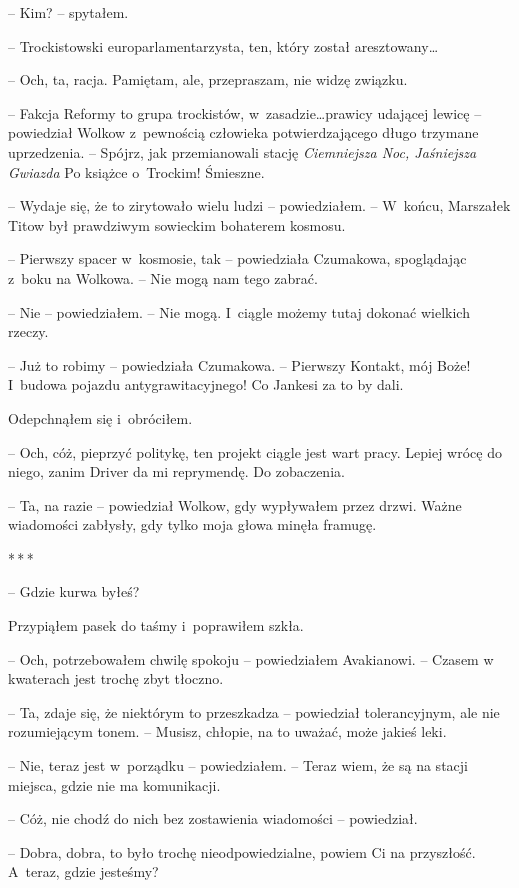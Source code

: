 \documentclass[oneside,polish,12pt,sfheadings]{mwbk}
\newcommand{\threeast}{\bigskip\par\centerline{*\,*\,*}\medskip\par}%
\begin{document}
-- Kim? -- spytałem.

-- Trockistowski europarlamentarzysta, ten, który został aresztowany\ldots

-- Och, ta, racja. Pamiętam, ale, przepraszam, nie widzę związku.

-- Fakcja Reformy to grupa trockistów, w~zasadzie\ldots prawicy udającej
lewicę -- powiedział Wolkow z~pewnością człowieka potwierdzającego długo
trzymane uprzedzenia. -- Spójrz, jak przemianowali stację
\emph{Ciemniejsza Noc, Jaśniejsza Gwiazda } Po książce o~Trockim!
Śmieszne.

-- Wydaje się, że to zirytowało wielu ludzi -- powiedziałem. -- W~końcu,
Marszałek Titow był prawdziwym sowieckim bohaterem kosmosu.

-- Pierwszy spacer w~kosmosie, tak -- powiedziała Czumakowa, spoglądając z~boku na Wolkowa. -- Nie mogą nam tego zabrać.

-- Nie -- powiedziałem. -- Nie mogą. I~ciągle możemy tutaj dokonać wielkich
rzeczy.

-- Już to robimy -- powiedziała Czumakowa. -- Pierwszy Kontakt, mój Boże! I~budowa pojazdu antygrawitacyjnego! Co Jankesi za to by dali.

Odepchnąłem się i~obróciłem.

-- Och, cóż, pieprzyć politykę, ten projekt ciągle jest wart pracy.
Lepiej wrócę do niego, zanim Driver da mi reprymendę. Do zobaczenia.

-- Ta, na razie -- powiedział Wolkow, gdy wypływałem przez drzwi. Ważne
wiadomości zabłysły, gdy tylko moja głowa minęła framugę.

\threeast

-- Gdzie kurwa byłeś?

Przypiąłem pasek do taśmy i~poprawiłem szkła.

-- Och, potrzebowałem chwilę spokoju -- powiedziałem Avakianowi. -- Czasem
w kwaterach jest trochę zbyt tłoczno.

-- Ta, zdaje się, że niektórym to przeszkadza -- powiedział tolerancyjnym,
ale nie rozumiejącym tonem. -- Musisz, chłopie, na to uważać, może jakieś
leki.

-- Nie, teraz jest w~porządku -- powiedziałem. -- Teraz wiem, że są na
stacji miejsca, gdzie nie ma komunikacji.

-- Cóż, nie chodź do nich bez zostawienia wiadomości -- powiedział.

-- Dobra, dobra, to było trochę nieodpowiedzialne, powiem Ci na
przyszłość. A~teraz, gdzie jesteśmy?
\end{document}
